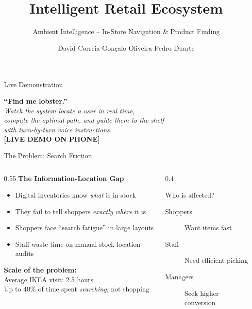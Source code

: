 \documentclass[aspectratio=169,12pt]{beamer}
\title{\textbf{Intelligent Retail Ecosystem}}
\subtitle{Ambient Intelligence -- In-Store Navigation \& Product Finding}
\author{David Correia \quad Gon\c{c}alo Oliveira \quad Pedro Duarte}
\institute{IST -- Alameda G11}
\date{}
\begin{document}
\begin{frame}
\titlepage
\end{frame}

\begin{frame}{Live Demonstration}
\begin{center}
\Large\textbf{``Find me lobster.''}\\[1.5em]
\normalsize
\textit{Watch the system locate a user in real time,\\
compute the optimal path, and guide them to the shelf\\
with turn-by-turn voice instructions.}\\[2em]
\textbf{[LIVE DEMO ON PHONE]}
\end{center}
\end{frame}

\begin{frame}{The Problem: Search Friction}
\begin{columns}[T]
\begin{column}{0.55\textwidth}
\textbf{The Information-Location Gap}
\begin{itemize}
    \item Digital inventories know \textit{what} is in stock
    \item They fail to tell shoppers \textit{exactly where} it is
    \item Shoppers face ``search fatigue'' in large layouts
    \item Staff waste time on manual stock-location audits
\end{itemize}
\vspace{1em}
\textbf{Scale of the problem:}\\
Average IKEA visit: 2.5 hours\\
Up to 40\% of time spent \textit{searching}, not shopping
\end{column}
\begin{column}{0.4\textwidth}
\begin{block}{Who is affected?}
\begin{description}
    \item[Shoppers] Want items fast
    \item[Staff] Need efficient picking
    \item[Managers] Seek higher conversion
\end{description}
\end{block}
\end{column}
\end{columns}
\end{frame}
\end{document}
